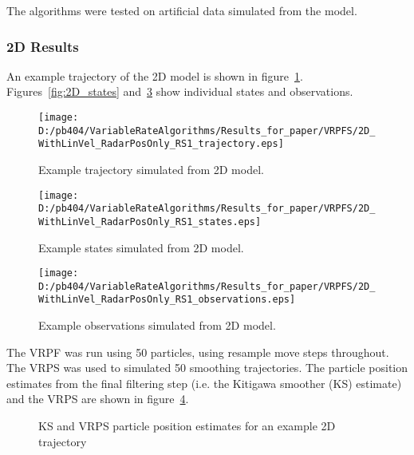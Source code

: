 \documentclass[a4paper,10pt]{article}
\begin{document}
The algorithms were tested on artificial data simulated from the model.

\subsubsection{2D Results}

An example trajectory of the 2D model is shown in figure~\ref{fig:2D_trajectory}. Figures~\ref{fig:2D_states} and~\ref{fig:2D_observations} show individual states and observations.

\begin{figure}[hbt]
\centering \texttt{[image: D:/pb404/VariableRateAlgorithms/Results\_for\_paper/VRPFS/2D\_WithLinVel\_RadarPosOnly\_RS1\_trajectory.eps]}
\caption{Example trajectory simulated from 2D model.}
\label{fig:2D_trajectory}
\end{figure}

\begin{figure}[hbt]
\centering \texttt{[image: D:/pb404/VariableRateAlgorithms/Results\_for\_paper/VRPFS/2D\_WithLinVel\_RadarPosOnly\_RS1\_states.eps]}
\caption{Example states simulated from 2D model.}
\label{fig:2D_state}
\end{figure}

\begin{figure}[hbt]
\centering \texttt{[image: D:/pb404/VariableRateAlgorithms/Results\_for\_paper/VRPFS/2D\_WithLinVel\_RadarPosOnly\_RS1\_observations.eps]}
\caption{Example observations simulated from 2D model.}
\label{fig:2D_observations}
\end{figure}

The VRPF was run using 50 particles, using resample move steps throughout. The VRPS was used to simulated 50 smoothing trajectories. The particle position estimates from the final filtering step (i.e. the Kitigawa smoother (KS) estimate) and the VRPS are shown in figure~\ref{fig:2D_particles}.

\begin{figure}[hbt]
\caption{KS and VRPS particle position estimates for an example 2D trajectory}
\label{fig:2D_particles}
\end{figure}
\end{document}
